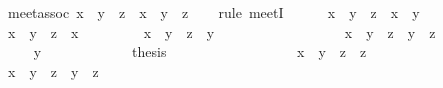\begin{isabellebody}
\ meet{\isacharunderscore}assoc{\isacharcolon}\ {\isachardoublequoteopen}{\isacharparenleft}x\ {\isasymsqinter}\ y{\isacharparenright}\ {\isasymsqinter}\ z\ {\isacharequal}\ x\ {\isasymsqinter}\ {\isacharparenleft}y\ {\isasymsqinter}\ z{\isacharparenright}{\isachardoublequoteclose}\isanewline
\ \ \isamarkupfalse%
\ {\isacharparenleft}rule\ meetI{\isacharparenright}\isanewline
\ \ \ \ \isamarkupfalse%
\ {\isachardoublequoteopen}x\ {\isasymsqinter}\ {\isacharparenleft}y\ {\isasymsqinter}\ z{\isacharparenright}\ {\isasymsqsubseteq}\ x\ {\isasymsqinter}\ y{\isachardoublequoteclose}\isanewline
\ \ \ \ \isamarkupfalse%
\isanewline
\ \ \ \ \ \ \isamarkupfalse%
\ {\isachardoublequoteopen}x\ {\isasymsqinter}\ {\isacharparenleft}y\ {\isasymsqinter}\ z{\isacharparenright}\ {\isasymsqsubseteq}\ x{\isachardoublequoteclose}\ \isacommand{{\isachardot}{\isachardot}}\isamarkupfalse%
\isanewline
\ \ \ \ \ \ \isamarkupfalse%
\ {\isachardoublequoteopen}x\ {\isasymsqinter}\ {\isacharparenleft}y\ {\isasymsqinter}\ z{\isacharparenright}\ {\isasymsqsubseteq}\ y{\isachardoublequoteclose}\isanewline
\ \ \ \ \ \ \isamarkupfalse%
\ {\isacharminus}\isanewline
\ \ \ \ \ \ \ \ \isamarkupfalse%
\ {\isachardoublequoteopen}x\ {\isasymsqinter}\ {\isacharparenleft}y\ {\isasymsqinter}\ z{\isacharparenright}\ {\isasymsqsubseteq}\ y\ {\isasymsqinter}\ z{\isachardoublequoteclose}\ \isacommand{{\isachardot}{\isachardot}}\isamarkupfalse%
\isanewline
\ \ \ \ \ \ \ \ \isamarkupfalse%
\ \isamarkupfalse%
\ {\isachardoublequoteopen}{\isasymdots}\ {\isasymsqsubseteq}\ y{\isachardoublequoteclose}\ \isacommand{{\isachardot}{\isachardot}}\isamarkupfalse%
\isanewline
\ \ \ \ \ \ \ \ \isamarkupfalse%
\ \isamarkupfalse%
\ {\isacharquery}thesis\ \isacommand{{\isachardot}}\isamarkupfalse%
\isanewline
\ \ \ \ \ \ \isamarkupfalse%
\isanewline
\ \ \ \ \isamarkupfalse%
\isanewline
\ \ \ \ \isamarkupfalse%
\ {\isachardoublequoteopen}x\ {\isasymsqinter}\ {\isacharparenleft}y\ {\isasymsqinter}\ z{\isacharparenright}\ {\isasymsqsubseteq}\ z{\isachardoublequoteclose}\isanewline
\ \ \ \ \isamarkupfalse%
\ {\isacharminus}\isanewline
\ \ \ \ \ \ \isamarkupfalse%
\ {\isachardoublequoteopen}x\ {\isasymsqinter}\ {\isacharparenleft}y\ {\isasymsqinter}\ z{\isacharparenright}\ {\isasymsqsubseteq}\ y\ {\isasymsqinter}\ z{\isachardoublequoteclose}\ \isacommand{{\isachardot}{\isachardot}}\isamarkupfalse%

\end{isabellebody}
